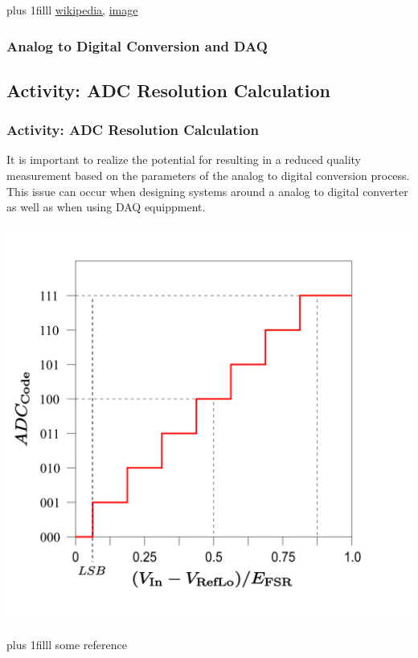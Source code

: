 \documentclass[fleqn]{beamer} %
\newcommand{\sectionIsubsectionIIItitle}{Analog to Digital Conversion and DAQ}
\newcommand{\sectionIsubsectionIVtitle}{Activity: ADC Resolution Calculation}
\newcommand{\btVFill}{\vskip0pt plus 1filll}
\begin{document}
\begin{frame}
				\btVFill
				\tiny{\href{https://en.wikipedia.org/wiki/Analog-to-digital_converter}{wikipedia,} \href{https://en.wikipedia.org/wiki/Analog-to-digital_converter\#/media/File:WM_WM8775SEDS-AB.jpg}{image} }	
			\end{frame}	

			\begin{frame} 
				\frametitle{\sectionIsubsectionIIItitle}

				
			\end{frame}	

		\subsection{\sectionIsubsectionIVtitle}\label{sectionIsubsectionIV}	

			\begin{frame}
				\frametitle{\sectionIsubsectionIVtitle} \scriptsize
				\bigskip

				It is important to realize the potential for \underline{\hspace{20mm}} resulting in a reduced quality measurement based on the parameters of the analog to digital conversion process. This issue can occur when designing systems around a \underline{\hspace{20mm}} analog to digital converter as well as when using \underline{\hspace{20mm}} DAQ equippment.  

				\includegraphics[scale=.2]{images/ADC_voltage_resolution.png}

				\btVFill
				\tiny{some reference}	

			\end{frame}
\end{document}
